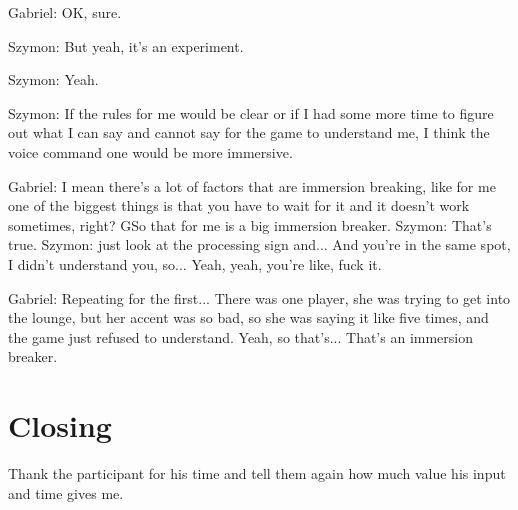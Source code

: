 \begin{QandA}
\begin{answered}
            Gabriel: OK, sure.

            Szymon: But yeah, it's an experiment.

            Szymon: Yeah.

            Szymon: If the rules for me would be clear or if I had some more time to figure out what I can say and cannot say for the game to understand me, I think the voice command one would be more immersive.

            Gabriel: I mean there's a lot of factors that are immersion breaking, like for me one of the biggest things is that you have to wait for it and it doesn't work sometimes, right?
            GSo that for me is a big immersion breaker.
            Szymon: That's true.
            Szymon: just look at the processing sign and... And you're in the same spot, I didn't understand you, so... Yeah, yeah, you're like, fuck it.

            Gabriel: Repeating for the first...
            There was one player, she was trying to get into the lounge, but her accent was so bad, so she was saying it like five times, and the game just refused to understand.
            Yeah, so that's... That's an immersion breaker.
         \end{answered}
\end{QandA}

\section{Closing}
Thank the participant for his time and tell them again how much value his input and time gives me.






